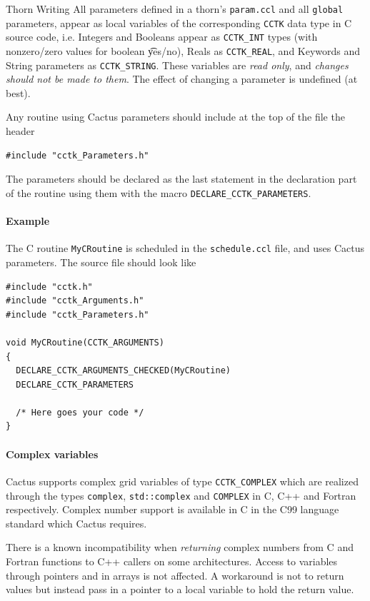\begin{cactuspart}{Thorn Writing}
All parameters defined in a thorn's \texttt{param.ccl} and all \texttt{global}
parameters, appear as local variables of the corresponding \texttt{CCTK} data type
in C source code, i.e. Integers and Booleans appear as \texttt{CCTK\_INT} types
(with nonzero/zero values for boolean {\t yes/no}), Reals as
\texttt{CCTK\_REAL}, and Keywords and String parameters as \texttt{CCTK\_STRING}.
These variables are \emph{read only}, and \emph{changes should not be made to
them}.  The effect of changing a parameter is undefined (at best).

Any routine using Cactus parameters should include at
the top of the file the header
\begin{verbatim}
#include "cctk_Parameters.h"
\end{verbatim}

The parameters should be declared as the last statement in the declaration part
of the routine using them with the macro \texttt{DECLARE\_CCTK\_PARAMETERS}.

\paragraph{Example}

The C routine \verb|MyCRoutine| is scheduled in the \texttt{schedule.ccl} file,
and uses Cactus parameters. The source file should look like
\begin{verbatim}
#include "cctk.h"
#include "cctk_Arguments.h"
#include "cctk_Parameters.h"

void MyCRoutine(CCTK_ARGUMENTS)
{
  DECLARE_CCTK_ARGUMENTS_CHECKED(MyCRoutine)
  DECLARE_CCTK_PARAMETERS

  /* Here goes your code */
}
\end{verbatim}

\paragraph{Complex variables}

Cactus supports complex grid variables of type \texttt{CCTK\_COMPLEX} which
are realized through the types \texttt{complex}, \texttt{std::complex} and
\texttt{COMPLEX} in C, C++ and Fortran respectively. Complex number support is
available in C in the C99 language standard which Cactus requires.

There is a known incompatibility when \emph{returning} complex numbers from C
and Fortran functions to C++ callers on some architectures. Access to
variables through pointers and in arrays is not affected. A workaround is not
to return values but instead pass in a pointer to a local variable to hold the
return value.


\end{cactuspart}
